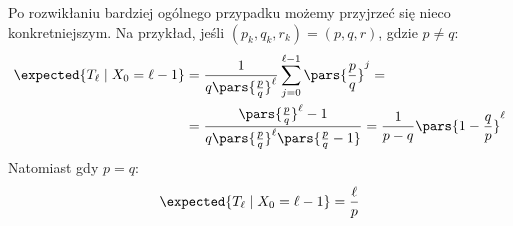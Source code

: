 \begin{example}
	Po rozwikłaniu bardziej ogólnego przypadku możemy przyjrzeć się nieco konkretniejszym. Na przykład, jeśli \((p_k, q_k, r_k) = (p, q, r)\), gdzie \(p \neq q\):
	\begin{align*}
		\expected{T_\ell \mid X_0 = \ell - 1} &= \frac{1}{q\pars{\frac{p}{q}}^\ell}\sum_{j=0}^{\ell-1}\pars{\frac{p}{q}}^j =\\
		&= \frac{\pars{\frac{p}{q}}^\ell - 1}{q\pars{\frac{p}{q}}^\ell \pars{\frac{p}{q}-1}} = \frac{1}{p-q}\pars{1 - \frac{q}{p}}^\ell
	\end{align*}
	Natomiast gdy \(p=q\):
	\begin{align*}
		\expected{T_\ell \mid X_0 = \ell - 1} = \frac{\ell}{p}
	\end{align*}
\end{example}